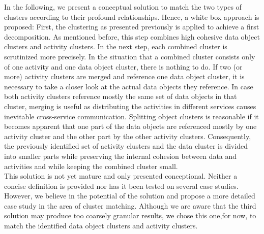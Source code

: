 In the following, we present a conceptual solution to match the two types of clusters according to their profound relationships. Hence, a white box approach is proposed: First, the clustering as presented previously is applied to achieve a first decomposition. As mentioned before, this step combines high cohesive data object clusters and activity clusters. In the next step, each combined cluster is scrutinized more precisely. In the situation that a combined cluster consists only of one activity and one data object cluster, there is nothing to do. If two (or more) activity clusters are merged and reference one data object cluster, it is necessary to take a closer look at the actual data objects they reference. In case both activity clusters reference mostly the same set of data objects in that cluster, merging is useful as distributing the activities in different services causes inevitable cross-service communication. Splitting object clusters is reasonable if it becomes apparent that one part of the data objects are referenced mostly by one activity cluster and the other part by the other activity clusters. Consequently, the previously identified set of activity clusters and the data cluster is divided into smaller parts while preserving the internal cohesion between data and activities and while keeping the combined cluster small. \\
This solution is not yet mature and only presented conceptional. Neither a concise definition is provided nor has it been tested on several case studies. However, we believe in the potential of the solution and propose a more detailed case study in the area of cluster matching. Although we are aware that the third solution may produce too coarsely granular results, we chose this one,for now, to match the identified data object clusters and activity clusters. \\





